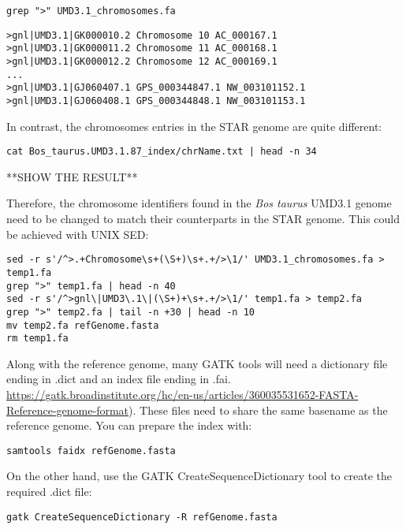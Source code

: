 \begin{verbatim}
grep ">" UMD3.1_chromosomes.fa
\end{verbatim}


\begin{verbatim}
>gnl|UMD3.1|GK000010.2 Chromosome 10 AC_000167.1
>gnl|UMD3.1|GK000011.2 Chromosome 11 AC_000168.1
>gnl|UMD3.1|GK000012.2 Chromosome 12 AC_000169.1
...
>gnl|UMD3.1|GJ060407.1 GPS_000344847.1 NW_003101152.1
>gnl|UMD3.1|GJ060408.1 GPS_000344848.1 NW_003101153.1
\end{verbatim}

In contrast, the chromosomes entries in the STAR genome are quite different:

\begin{verbatim}
cat Bos_taurus.UMD3.1.87_index/chrName.txt | head -n 34
\end{verbatim}

**SHOW THE RESULT**

Therefore, the chromosome identifiers found in the \textit{Bos taurus} UMD3.1 genome need to be changed to match their counterparts in the STAR genome. This could be achieved with UNIX SED:

\begin{verbatim}
sed -r s'/^>.+Chromosome\s+(\S+)\s+.+/>\1/' UMD3.1_chromosomes.fa > temp1.fa
grep ">" temp1.fa | head -n 40
sed -r s'/^>gnl\|UMD3\.1\|(\S+)+\s+.+/>\1/' temp1.fa > temp2.fa
grep ">" temp2.fa | tail -n +30 | head -n 10
mv temp2.fa refGenome.fasta
rm temp1.fa
\end{verbatim}


Along with the reference genome, many GATK tools will need a dictionary file ending in .dict and an index file ending in .fai.\href{https://gatk.broadinstitute.org/hc/en-us/articles/360035531652-FASTA-Reference-genome-format}{ https://gatk.broadinstitute.org/hc/en-us/articles/360035531652-FASTA-Reference-genome-format}). These files need to share the same basename as the reference genome. You can prepare the index with:

\begin{verbatim}
samtools faidx refGenome.fasta
\end{verbatim}

On the other hand, use the GATK CreateSequenceDictionary tool to create the required .dict file:

\begin{verbatim}
gatk CreateSequenceDictionary -R refGenome.fasta
\end{verbatim}




